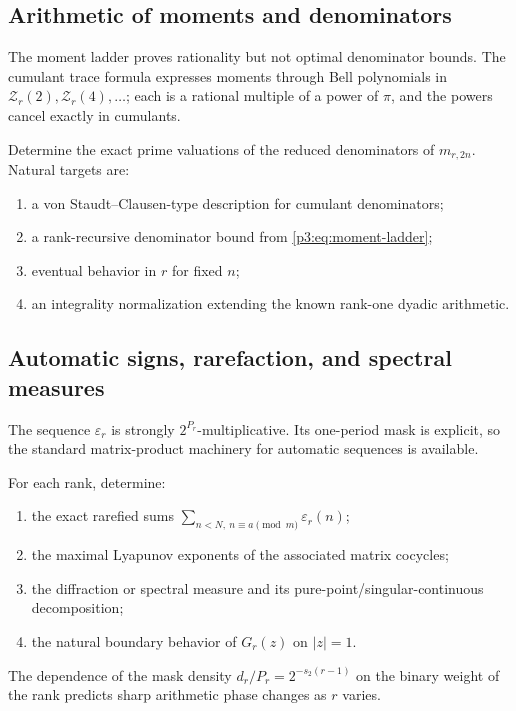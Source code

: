 \documentclass[11pt,oneside]{article}
\theoremstyle{definition}
\theoremstyle{remark}
\begin{document}
\subsection{Arithmetic of moments and denominators}

The moment ladder proves rationality but not optimal denominator bounds.  The cumulant trace formula expresses moments through Bell polynomials in
$\mathcal Z_r(2),\mathcal Z_r(4),\ldots$; each is a rational multiple of a power of $\pi$, and the powers cancel exactly in cumulants.

\begin{frontierproblem}
Determine the exact prime valuations of the reduced denominators of
$m_{r,2n}$.  Natural targets are:
\begin{enumerate}[label=(\roman*)]
\item a von Staudt--Clausen-type description for cumulant denominators;
\item a rank-recursive denominator bound from \eqref{p3:eq:moment-ladder};
\item eventual behavior in $r$ for fixed $n$;
\item an integrality normalization extending the known rank-one dyadic arithmetic.
\end{enumerate}
\end{frontierproblem}

\subsection{Automatic signs, rarefaction, and spectral measures}

The sequence $\varepsilon_r$ is strongly $2^{P_r}$-multiplicative.  Its one-period mask is explicit, so the standard matrix-product machinery for automatic sequences is available.

\begin{frontierproblem}
For each rank, determine:
\begin{enumerate}[label=(\roman*)]
\item the exact rarefied sums $\sum_{n<N,\ n\equiv a\pmod m}\varepsilon_r(n)$;
\item the maximal Lyapunov exponents of the associated matrix cocycles;
\item the diffraction or spectral measure and its pure-point/singular-continuous decomposition;
\item the natural boundary behavior of $G_r(z)$ on $|z|=1$.
\end{enumerate}
The dependence of the mask density $d_r/P_r=2^{-s_2(r-1)}$ on the binary weight of the rank predicts sharp arithmetic phase changes as $r$ varies.
\end{frontierproblem}
\end{document}
